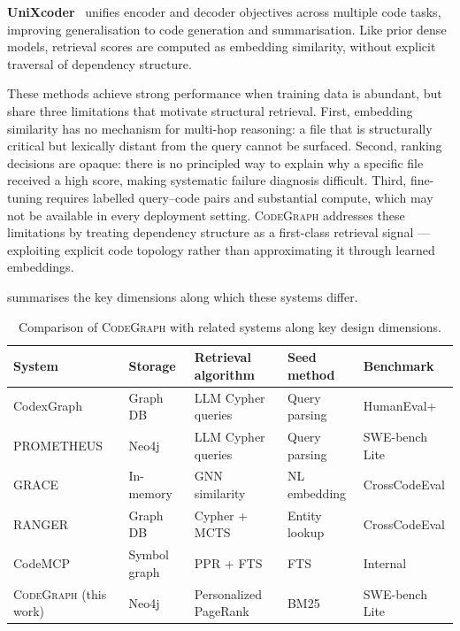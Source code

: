 \textbf{UniXcoder}~\cite{unixcoder} unifies encoder and decoder objectives across
multiple code tasks, improving generalisation to code generation and summarisation.
Like prior dense models, retrieval scores are computed as embedding similarity, without
explicit traversal of dependency structure.

These methods achieve strong performance when training data is abundant, but share three
limitations that motivate structural retrieval.
First, embedding similarity has no mechanism for multi-hop reasoning: a file that is
structurally critical but lexically distant from the query cannot be surfaced.
Second, ranking decisions are opaque: there is no principled way to explain why a
specific file received a high score, making systematic failure diagnosis difficult.
Third, fine-tuning requires labelled query--code pairs and substantial compute, which may
not be available in every deployment setting.
\textsc{CodeGraph} addresses these limitations by treating dependency structure as a
first-class retrieval signal — exploiting explicit code topology rather than approximating
it through learned embeddings.

 summarises the key dimensions along which these systems differ.

\begin{table}[htbp]
    \centering
    \caption{Comparison of \textsc{CodeGraph} with related systems along key design dimensions.}
    \label{tab:related-systems}
    \begin{tabularx}{\textwidth}{l l X X l}
        \toprule
        System                              & Storage      & Retrieval algorithm   & Seed method   & Benchmark      \\
        \midrule
        CodexGraph~\cite{liu2024codexgraph} & Graph DB     & LLM Cypher queries    & Query parsing & HumanEval+     \\
        PROMETHEUS~\cite{prometheus2024}    & Neo4j        & LLM Cypher queries    & Query parsing & SWE-bench Lite \\
        GRACE~\cite{grace2026}              & In-memory    & GNN similarity        & NL embedding  & CrossCodeEval  \\
        RANGER~\cite{ranger2025}            & Graph DB     & Cypher + MCTS         & Entity lookup & CrossCodeEval  \\
        CodeMCP~\cite{codemcp}              & Symbol graph & PPR + FTS             & FTS           & Internal       \\
        \textsc{CodeGraph} (this work)      & Neo4j        & Personalized PageRank & BM25          & SWE-bench Lite \\
        \bottomrule
    \end{tabularx}
\end{table}

